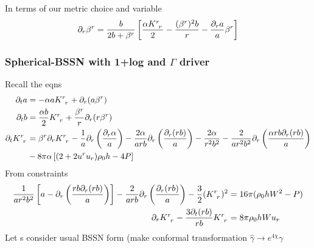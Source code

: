 \documentclass[prd]{revtex4}
\newcommand*\apost{\textsc{\char13}}
\begin{document}
In terms of our metric choice and variable
\begin{align}
\partial_r \beta^r = \frac{b}{2b+\beta^r} \left[\frac{\alpha K\indices{^r_r}}{2} - \frac{(\beta^r)^2 b}{r}- \frac{\partial_r a}{a} \beta^r \right]
\end{align}

\subsubsection{Spherical-BSSN with 1+log and $\Gamma$ driver}
Recall the eqns
\begin{align}
\partial_t a &= - \alpha a K\indices{^r_r} + \partial_r (a \beta^r) \\
\partial_t b &=  \frac{\alpha b}{2} K\indices{^r_r} + \frac{\beta^r}{r} \partial_r (r \beta^r) \\
\partial_t K\indices{^r_r} &= \beta^r \partial_r K\indices{^r_r}  - \frac{1}{a} \partial_r \left( \frac{\partial_r \alpha}{a} \right) - \frac{2 \alpha}{arb} \partial_r \left( \frac{\partial_r (rb)}{a} \right) 
-  \frac{2 \alpha}{r^2 b^2} - \frac{2}{ar^2b^2} \partial_r \left( \frac{\alpha r b \partial_r (rb)}{a} \right)  \nonumber \\
& - 8 \pi \alpha \left[ (2+2 u^r u_r) \rho_0 h - 4P \right] 
\end{align}
From constraints
\begin{align}
 \frac{1}{ar^2b^2} \left[a-\partial_r \left(\frac{rb \partial_r (rb)}{a} \right) \right] -\frac{2}{arb} \partial_r \left(\frac{\partial_r (rb)}{a} \right) - \frac{3}{2}(K\indices{^r_r})^2 &= 16 \pi (\rho_0 h W^2 -P) \nonumber \\
  \partial_r K\indices{^r_r} -\frac{3 \partial_t (r b)}{rb}  K\indices{^r_r} &= 8 \pi \rho_0 h W u_r
\end{align}
Let \apost s consider usual BSSN form (make conformal transformation $\hat{\gamma} \rightarrow e^{4\chi} \gamma$



\end{document}

